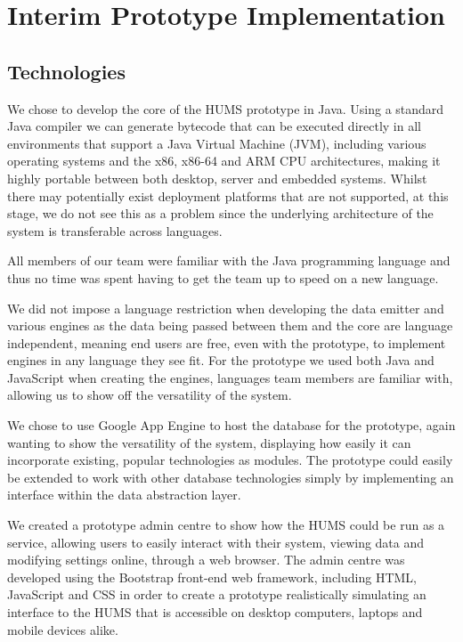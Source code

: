 \documentclass[10pt,a4paper]{article}
\begin{document}

\section{Interim Prototype Implementation}

\subsection{Technologies}
We chose to develop the core of the HUMS prototype in Java. Using a standard Java compiler we can generate bytecode that can be executed directly in all environments that support a Java Virtual Machine (JVM), including various operating systems and the x86, x86-64 and ARM CPU architectures, making it highly portable between both desktop, server and embedded systems. %
Whilst there may potentially exist deployment platforms that are not supported, at this stage, we do not see this as a problem since the underlying architecture of the system is transferable across languages.

All members of our team were familiar with the Java programming language and thus no time was spent having to get the team up to speed on a new language. 

We did not impose a language restriction when developing the data emitter and various engines as the data being passed between them and the core are language independent, meaning end users are free, even with the prototype, to implement engines in any language they see fit. For the prototype we used both Java and JavaScript when creating the engines, languages team members are familiar with, allowing us to show off the versatility of the system.

We chose to use Google App Engine to host the database for the prototype, again wanting to show the versatility of the system, displaying how easily it can incorporate existing, popular technologies as modules. The prototype could easily be extended to work with other database technologies simply by implementing an interface within the data abstraction layer.

We created a prototype admin centre to show how the HUMS could be run as a service, allowing users to easily interact with their system, viewing data and modifying settings online, through a web browser. The admin centre was developed using the Bootstrap front-end web framework, including HTML, JavaScript and CSS in order to create a prototype realistically simulating an interface to the HUMS that is accessible on desktop computers, laptops and mobile devices alike.
\end{document}

